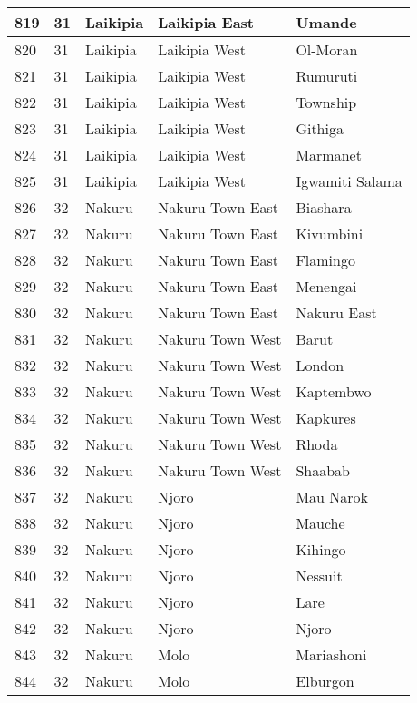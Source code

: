 \begin{table}[!ht]
\begin{tabular}{|l|l|l|l|l|}
        819 & 31 & Laikipia & Laikipia East & Umande \\ \hline
        820 & 31 & Laikipia & Laikipia West & Ol-Moran \\ \hline
        821 & 31 & Laikipia & Laikipia West & Rumuruti \\ \hline
        822 & 31 & Laikipia & Laikipia West & Township \\ \hline
        823 & 31 & Laikipia & Laikipia West & Githiga \\ \hline
        824 & 31 & Laikipia & Laikipia West & Marmanet \\ \hline
        825 & 31 & Laikipia & Laikipia West & Igwamiti Salama \\ \hline
        826 & 32 & Nakuru & Nakuru Town East & Biashara \\ \hline
        827 & 32 & Nakuru & Nakuru Town East & Kivumbini \\ \hline
        828 & 32 & Nakuru & Nakuru Town East & Flamingo \\ \hline
        829 & 32 & Nakuru & Nakuru Town East & Menengai \\ \hline
        830 & 32 & Nakuru & Nakuru Town East & Nakuru East \\ \hline
        831 & 32 & Nakuru & Nakuru Town West & Barut \\ \hline
        832 & 32 & Nakuru & Nakuru Town West & London \\ \hline
        833 & 32 & Nakuru & Nakuru Town West & Kaptembwo \\ \hline
        834 & 32 & Nakuru & Nakuru Town West & Kapkures \\ \hline
        835 & 32 & Nakuru & Nakuru Town West & Rhoda \\ \hline
        836 & 32 & Nakuru & Nakuru Town West & Shaabab \\ \hline
        837 & 32 & Nakuru & Njoro & Mau Narok \\ \hline
        838 & 32 & Nakuru & Njoro & Mauche \\ \hline
        839 & 32 & Nakuru & Njoro & Kihingo \\ \hline
        840 & 32 & Nakuru & Njoro & Nessuit \\ \hline
        841 & 32 & Nakuru & Njoro & Lare \\ \hline
        842 & 32 & Nakuru & Njoro & Njoro \\ \hline
        843 & 32 & Nakuru & Molo & Mariashoni \\ \hline
        844 & 32 & Nakuru & Molo & Elburgon \\ \hline

\end{tabular}
\end{table}
